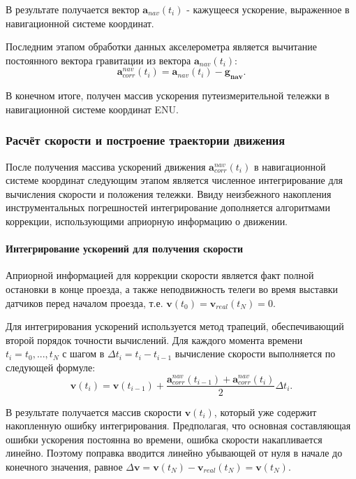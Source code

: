 В результате получается вектор $\bm{a}_{nav}(t_i)$ - кажущееся ускорение, выраженное в навигационной системе координат.

Последним этапом обработки данных акселерометра является вычитание постоянного вектора гравитации из вектора $\bm{a}_{nav}(t_i)$:
\begin{equation*}
	\bm{a}_{corr}^{nav}(t_i) = \bm{a}_{nav}(t_i) - \bm{g_{nav}} \text{.}
\end{equation*}

В конечном итоге, получен массив ускорения путеизмерительной тележки в навигационной системе координат ENU. \\


\subsubsection{Расчёт скорости и построение траектории движения}
После получения массива ускорений движения $\bm{a}_{corr}^{nav}(t_i)$ в навигационной системе координат следующим этапом является численное интегрирование для вычисления скорости и положения тележки. Ввиду неизбежного накопления инструментальных погрешностей интегрирование дополняется алгоритмами коррекции, использующими априорную информацию о движении.

\paragraph{Интегрирование ускорений для получения скорости}
Априорной информацией для коррекции скорости является факт полной остановки в конце проезда, а также неподвижность телеги во время выставки датчиков перед началом проезда, т.е. $\bm{v}(t_0) = \bm{v}_{real}(t_N) = 0$.

Для интегрирования ускорений используется метод трапеций, обеспечивающий второй порядок точности вычислений. Для каждого момента времени $t_i = t_0, ..., t_N$ с шагом в $\Delta t_i = t_i - t_{i-1}$ вычисление скорости выполняется по следующей формуле:
\begin{equation}
	\bm{v}(t_i) = \bm{v}(t_{i-1}) + \frac{\bm{a}_{corr}^{nav}(t_{i-1}) + \bm{a}_{corr}^{nav}(t_i)}{2} \Delta t_i \text{.}
\end{equation}

В результате получается массив скорости $\bm{v}(t_i)$, который уже содержит накопленную ошибку интегрирования. Предполагая, что основная составляющая ошибки ускорения постоянна во времени, ошибка скорости накапливается линейно. Поэтому поправка вводится линейно убывающей от нуля в начале до конечного значения, равное $\Delta \bm{v} = \bm{v}(t_N) - \bm{v}_{real}(t_N) = \bm{v}(t_N)$.

